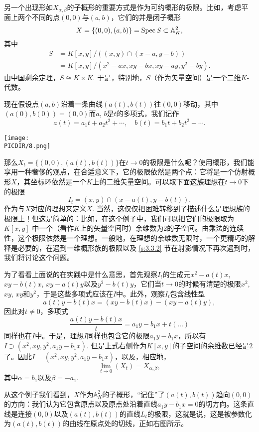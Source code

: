 另一个出现形如$X_{\alpha,\beta}$的子概形的重要方式是作为可约概形的极限。比如，考虑平面上两个不同的点$(0,0)$与$(a,b)$，它们的并是闭子概形
\[
	X=\{(0,0),(a,b)\}=\operatorname{Spec} S\subset \mathbb{A}_K^2,
\]
其中
\[
\begin{aligned}
	S&=K[x,y]/\left((x,y)\cap (x-a,y-b)\right)\\
	&=K[x,y]/(x^2-ax,xy-bx,xy-ay,y^2-by).
\end{aligned}
\]
由中国剩余定理，$S\cong K\times K$. 于是，特别地，$S$（作为矢量空间）是一个二维$K$\hyp 代数。

现在假设点$(a,b)$沿着一条曲线$(a(t),b(t))$往$(0,0)$移动，其中$(a(0),b(0))=(0,0)$而$a$, $b$是$t$的多项式，我们记作
\[
	a(t)=a_1t+a_2t^2+\cdots,\quad b(t)=b_1t+b_2t^2+\cdots.
\]

\begin{center}\texttt{[image: \\PICDIR/8.png]}\end{center}

那么$X_t=\{(0,0),(a(t),b(t))\}$在$t\to 0$的极限是什么呢？使用概形，我们能享用一种奢侈的观点，在合适意义下，它的极限依然是两个点：它将是一个仿射概形$X$，其坐标环依然是一个$K$上的二维矢量空间。可以取下面这族理想在$t\to 0$下的极限
\[
	I_t=(x,y)\cap (x-a(t),y-b(t)).
\]
作为与$X$对应的理想来定义$X$. 当然，这仅仅把困难转移到了描述什么是理想族的极限上！但这是简单的：比如，在这个例子中，我们可以把它们的极限取为$K[x,y]$
中一个（看作$K$上的矢量空间时）余维数为$2$的子空间。由乘法的连续性，这个极限依然是一个理想。一般地，在理想的余维数无限时，一个更精巧的解释是必要的，在遇到一维概形族的极限以及 \ref{s:3.3.2} 节在射影情况下再次遇到时，我们将讨论这个问题。

为了看看上面说的在实践中是什么意思，首先观察$I_t$的生成元$x^2-a(t)x$, $xy-b(t)x$, $xy-a(t)y$以及$y^2-b(t)y$，它们当$t\to 0$的时候有清楚的极限$x^2$, $xy$, $xy$和$y^2$，于是这些多项式应该在$I$中。此外，观察$I_t$包含线性型
\[
	a(t)y-b(t)x=(xy-b(t)x)-(xy-a(t)y),
\]
因此对$t\neq 0$，多项式
\[
	\frac{a(t)y-b(t)x}{t}=a_1y-b_1x+t(\dots)
\]
同样也在$I$中。于是，理想$I$同样也包含它的极限$a_1y-b_1x$，所以有$I\supset (x^2,xy,y^2,a_1y-b_1x)$. 但是上式右侧作为$K[x,y]$的子空间的余维数已经是$2$了。因此$I=(x^2,xy,y^2,a_1y-b_1x)$，以及，相应地，
\[
	\lim_{t\to 0}(X_t)=X_{\alpha,\beta},
\]
其中$\alpha=b_1$以及$\beta=-a_1$.

\wrapb
\indent 从这个例子我们看到，$X$作为$\mathbb{A}_K^2$的子概形，“记住”了$(a(t),b(t))$趋向$(0,0)$的方向：我们认为它包含原点以及原点处沿着直线$a_1y-b_1x=0$的切方向。这条直线是连接$(0,0)$以及$(a(t),b(t))$的直线$L_t$的极限，这就是说，这是被参数化为$(a(t),b(t))$的曲线在原点处的切线，正如右图所示。


